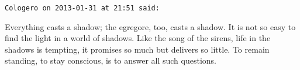 \begin{footnotesize}
\begin{sffamily}
\hfill

\texttt{Cologero on 2013-01-31 at 21:51 said:}

Everything casts a shadow; the egregore, too, casts a shadow. It is not so easy to find the light in a world of shadows. Like the song of the sirens, life in the shadows is tempting, it promises so much but delivers so little. To remain standing, to stay conscious, is to answer all such questions.


\hfill

\end{sffamily}
\end{footnotesize}

